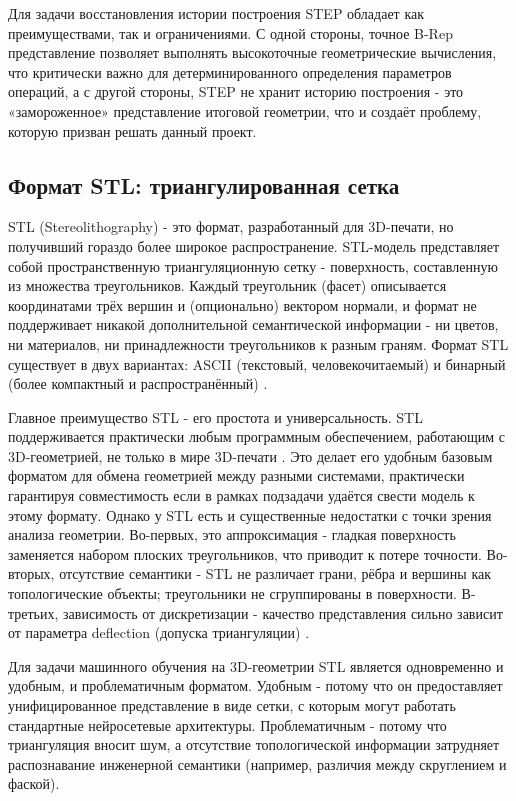Для задачи восстановления истории построения STEP обладает как преимуществами, так и ограничениями. С одной стороны, точное B-Rep представление позволяет выполнять высокоточные геометрические вычисления, что критически важно для детерминированного определения параметров операций, а с другой стороны, STEP не хранит историю построения - это «замороженное» представление итоговой геометрии, что и создаёт проблему, которую призван решать данный проект.

\subsection{Формат STL: триангулированная сетка}

STL (Stereolithography) - это формат, разработанный для 3D-печати, но получивший гораздо более широкое распространение. STL-модель представляет собой пространственную триангуляционную сетку - поверхность, составленную из множества треугольников. Каждый треугольник (фасет) описывается координатами трёх вершин и (опционально) вектором нормали, и формат не поддерживает никакой дополнительной семантической информации - ни цветов, ни материалов, ни принадлежности треугольников к разным граням. Формат STL существует в двух вариантах: ASCII (текстовый, человекочитаемый) и бинарный (более компактный и распространённый) \cite{cvut2026}.

Главное преимущество STL - его простота и универсальность. STL поддерживается практически любым программным обеспечением, работающим с 3D-геометрией, не только в мире 3D-печати \cite{cccp3d2013}. Это делает его удобным базовым форматом для обмена геометрией между разными системами, практически гарантируя совместимость если в рамках подзадачи удаётся свести модель к этому формату. Однако у STL есть и существенные недостатки с точки зрения анализа геометрии. Во-первых, это аппроксимация - гладкая поверхность заменяется набором плоских треугольников, что приводит к потере точности. Во-вторых, отсутствие семантики - STL не различает грани, рёбра и вершины как топологические объекты; треугольники не сгруппированы в поверхности. В-третьих, зависимость от дискретизации - качество представления сильно зависит от параметра deflection (допуска триангуляции) \cite{flowvision2023}.

Для задачи машинного обучения на 3D-геометрии STL является одновременно и удобным, и проблематичным форматом. Удобным - потому что он предоставляет унифицированное представление в виде сетки, с которым могут работать стандартные нейросетевые архитектуры. Проблематичным - потому что триангуляция вносит шум, а отсутствие топологической информации затрудняет распознавание инженерной семантики (например, различия между скруглением и фаской).

